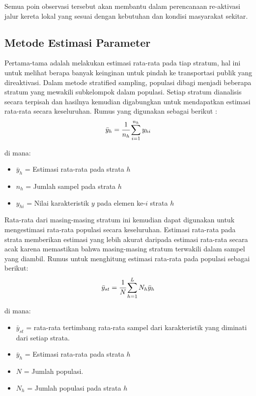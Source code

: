 \documentclass{article}
\begin{document}
Semua poin observasi tersebut akan membantu dalam perencanaan re-aktivasi jalur kereta lokal yang sesuai dengan kebutuhan dan kondisi masyarakat sekitar.

\subsection{Metode Estimasi Parameter}

Pertama-tama adalah melakukan estimasi rata-rata pada tiap stratum, hal ini untuk melihat berapa banyak keinginan untuk pindah ke transportasi publik yang direaktivasi. Dalam metode stratified sampling, populasi dibagi menjadi beberapa stratum yang mewakili subkelompok dalam populasi. Setiap stratum dianalisis secara terpisah dan hasilnya kemudian digabungkan untuk mendapatkan estimasi rata-rata secara keseluruhan. Rumus yang digunakan sebagai berikut \cite{thompson_2012}:
\begin{align}
    \bar{y}_{h} = \cfrac{1}{n_{h}} \sum_{i=1}^{n_{h}} y_{hi}
\end{align} 

di mana:
\begin{itemize}
    \item $\bar{y}_{h}$ = Estimasi rata-rata pada strata $h$
    \item $n_{h}$ = Jumlah sampel pada strata $h$
    \item $y_{hi}$ = Nilai karakteristik $y$ pada elemen ke-$i$ strata $h$
\end{itemize}

Rata-rata dari masing-masing stratum ini kemudian dapat digunakan untuk mengestimasi rata-rata populasi secara keseluruhan. Estimasi rata-rata pada strata memberikan estimasi yang lebih akurat daripada estimasi rata-rata secara acak karena memastikan bahwa masing-masing stratum terwakili dalam sampel yang diambil. Rumus untuk menghitung estimasi rata-rata pada populasi sebagai berikut:
\begin{align}
    \bar{y}_{st} = \cfrac{1}{N} \sum_{h=1}^{L} N_{h} \bar{y}_{h}
\end{align}

di mana:
\begin{itemize}
    \item $\bar{y}_{st}$ = rata-rata tertimbang rata-rata sampel dari karakteristik yang diminati dari setiap strata.
    \item $\bar{y}_{h}$ = Estimasi rata-rata pada strata $h$
    \item $N$ = Jumlah populasi.
    \item $N_{h}$ = Jumlah populasi pada strata $h$
\end{itemize}
\end{document}
